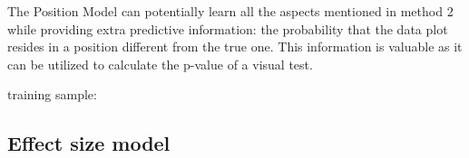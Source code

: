 \documentclass[]{interact}
\theoremstyle{plain}%
\theoremstyle{definition}
\theoremstyle{remark}
\begin{document}
The Position Model can potentially learn all the aspects mentioned in
method 2 while providing extra predictive information: the probability
that the data plot resides in a position different from the true one.
This information is valuable as it can be utilized to calculate the
p-value of a visual test.

training sample:

\hypertarget{effect-size-model}{%
\subsection{Effect size model}\label{effect-size-model}}
\end{document}
